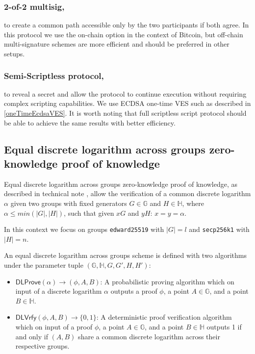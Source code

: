\documentclass{llncs}
\newcommand{\DLProve}{\textsf{DLProve}}
\newcommand{\DLVrfy}{\textsf{DLVrfy}}
\newcommand{\GG}{\mathbb{G}}
\newcommand{\HH}{\mathbb{H}}
\begin{document}
\subsubsection{2-of-2 multisig,}
to create a common path accessible only by the two participants if both agree. In this protocol we use the on-chain option in the context of Bitcoin, but off-chain multi-signature schemes are more efficient and should be preferred in other setups.

\subsubsection{Semi-Scriptless protocol,}
to reveal a secret and allow the protocol to continue execution without requiring complex scripting capabilities. We use ECDSA one-time VES such as described in \ref{oneTimeEcdsaVES}. It is worth noting that full scriptless script \cite{poelstra-adaptor} protocol should be able to achieve the same results with better efficiency.

\subsection{Equal discrete logarithm across groups zero-knowledge proof of knowledge}
Equal discrete logarithm across groups zero-knowledge proof of knowledge, as described in technical note \cite{MRL0010}, allow the verification of a common discrete logarithm $\alpha$ given two groups with fixed generators $G \in \GG$ and $H \in \HH$, where $\alpha \leq min(|G|,|H|)$, such that given $xG$ and $yH$: $x=y=\alpha$.

In this context we focus on groups \texttt{edward25519} with $|G| = l$ and \texttt{secp256k1} with $|H| = n$.

\begin{definition}
    An equal discrete logarithm across groups scheme is defined with two algorithms under the parameter tuple $(\GG,\HH,G,G',H,H')$:
\begin{itemize}
    \item $\DLProve(\alpha) \rightarrow (\phi,A,B)$: A probabilistic proving algorithm which on input of a discrete logarithm $\alpha$ outputs a proof $\phi$, a point $A \in \GG$, and a point $B \in \HH$.
    \item $\DLVrfy(\phi,A,B) \rightarrow \{0,1\}$: A deterministic proof verification algorithm which on input of a proof $\phi$, a point $A \in \GG$, and a point $B \in \HH$ outputs 1 if and only if $(A,B)$ share a common discrete logarithm across their respective groups.
\end{itemize}
\end{definition}
\end{document}
